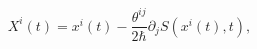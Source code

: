 \begin{equation}
X^{i}(t)=x^{i}(t)-\frac{\theta^{ij}}{2\hbar}\partial_{j}S(x^{i}%
(t),t),\label{29.5}%
\end{equation}

